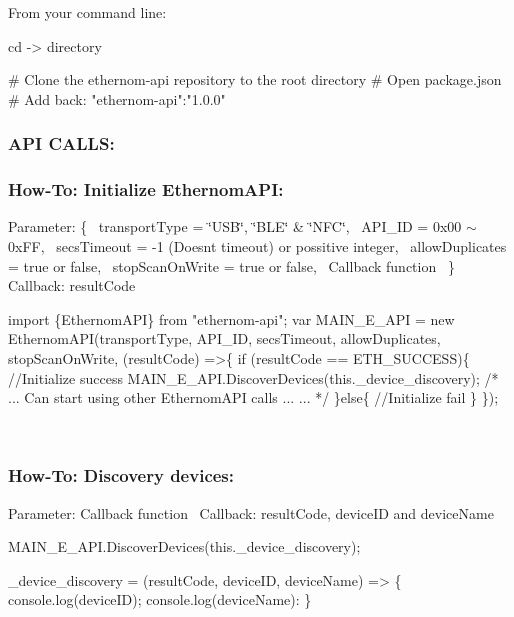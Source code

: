 From your command line\+: 
\begin{DoxyCode}
cd -> directory

# Clone the ethernom-api repository to the root directory
# Open package.json
# Add back: "ethernom-api":"1.0.0"
\end{DoxyCode}


\subsubsection*{A\+PI C\+A\+L\+LS\+:}

\subsubsection*{How-\/\+To\+: Initialize Ethernom\+A\+PI\+:}

Parameter\+: \{~\newline
 transport\+Type = \char`\"{}\+U\+S\+B\char`\"{}, \char`\"{}\+B\+L\+E\char`\"{} \& \char`\"{}\+N\+F\+C\char`\"{},~\newline
 A\+P\+I\+\_\+\+ID = 0x00 $\sim$ 0x\+FF,~\newline
 secs\+Timeout = -\/1 (Doesn\textquotesingle{}t timeout) or possitive integer,~\newline
 allow\+Duplicates = true or false,~\newline
 stop\+Scan\+On\+Write = true or false,~\newline
 Callback function~\newline
 \}~\newline
 Callback\+: result\+Code 
\begin{DoxyCode}
import \{EthernomAPI\} from "ethernom-api";
var MAIN\_E\_API = new EthernomAPI(transportType, API\_ID, secsTimeout, allowDuplicates, stopScanOnWrite,
       (resultCode) =>\{
    if (resultCode == ETH\_SUCCESS)\{
        //Initialize success
        MAIN\_E\_API.DiscoverDevices(this.\_device\_discovery);
        /*
        ...
        Can start using other EthernomAPI calls
        ...
        ...
        */
    \}else\{
        //Initialize fail
    \}
\});
\end{DoxyCode}
 ~\newline


\subsubsection*{How-\/\+To\+: Discovery devices\+:}

Parameter\+: Callback function~\newline
 Callback\+: result\+Code, device\+ID and device\+Name 
\begin{DoxyCode}
MAIN\_E\_API.DiscoverDevices(this.\_device\_discovery);

\_device\_discovery = (resultCode, deviceID, deviceName) => \{
    console.log(deviceID);
    console.log(deviceName):
\}
\end{DoxyCode}
 ~\newline


